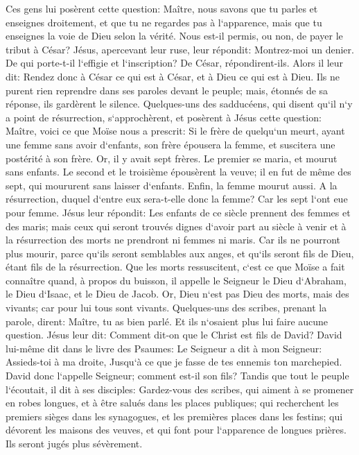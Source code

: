 \verse Ces gens lui posèrent cette question: Maître, nous savons que tu parles et enseignes droitement, et que tu ne regardes pas à l`apparence, mais que tu enseignes la voie de Dieu selon la vérité. 
\verse Nous est-il permis, ou non, de payer le tribut à César? 
\verse Jésus, apercevant leur ruse, leur répondit: Montrez-moi un denier. 
\verse De qui porte-t-il l`effigie et l`inscription? De César, répondirent-ils. 
\verse Alors il leur dit: Rendez donc à César ce qui est à César, et à Dieu ce qui est à Dieu. 
\verse Ils ne purent rien reprendre dans ses paroles devant le peuple; mais, étonnés de sa réponse, ils gardèrent le silence. 
\verse Quelques-uns des sadducéens, qui disent qu`il n`y a point de résurrection, s`approchèrent, et posèrent à Jésus cette question: 
\verse Maître, voici ce que Moïse nous a prescrit: Si le frère de quelqu`un meurt, ayant une femme sans avoir d`enfants, son frère épousera la femme, et suscitera une postérité à son frère. 
\verse Or, il y avait sept frères. Le premier se maria, et mourut sans enfants. 
\verse Le second et le troisième épousèrent la veuve; 
\verse il en fut de même des sept, qui moururent sans laisser d`enfants. 
\verse Enfin, la femme mourut aussi. 
\verse A la résurrection, duquel d`entre eux sera-t-elle donc la femme? Car les sept l`ont eue pour femme. 
\verse Jésus leur répondit: Les enfants de ce siècle prennent des femmes et des maris; 
\verse mais ceux qui seront trouvés dignes d`avoir part au siècle à venir et à la résurrection des morts ne prendront ni femmes ni maris. 
\verse Car ils ne pourront plus mourir, parce qu`ils seront semblables aux anges, et qu`ils seront fils de Dieu, étant fils de la résurrection. 
\verse Que les morts ressuscitent, c`est ce que Moïse a fait connaître quand, à propos du buisson, il appelle le Seigneur le Dieu d`Abraham, le Dieu d`Isaac, et le Dieu de Jacob. 
\verse Or, Dieu n`est pas Dieu des morts, mais des vivants; car pour lui tous sont vivants. 
\verse Quelques-uns des scribes, prenant la parole, dirent: Maître, tu as bien parlé. 
\verse Et ils n`osaient plus lui faire aucune question. 
\verse Jésus leur dit: Comment dit-on que le Christ est fils de David? 
\verse David lui-même dit dans le livre des Psaumes: Le Seigneur a dit à mon Seigneur: Assieds-toi à ma droite, 
\verse Jusqu`à ce que je fasse de tes ennemis ton marchepied. 
\verse David donc l`appelle Seigneur; comment est-il son fils? 
\verse Tandis que tout le peuple l`écoutait, il dit à ses disciples: 
\verse Gardez-vous des scribes, qui aiment à se promener en robes longues, et à être salués dans les places publiques; qui recherchent les premiers sièges dans les synagogues, et les premières places dans les festins; 
\verse qui dévorent les maisons des veuves, et qui font pour l`apparence de longues prières. Ils seront jugés plus sévèrement. 

